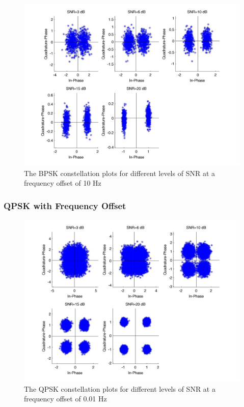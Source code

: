 \documentclass[]{article}
\begin{document}
\begin{figure}[H]
\centering
\hspace*{-2cm}\includegraphics[width=1.3\textwidth]{bpConstfo4.jpg}
\caption{The BPSK constellation plots for different levels of SNR at a frequency offset of 10 Hz}
\end{figure}

\subsubsection{QPSK with Frequency Offset}
\begin{figure}[H]
\centering
\hspace*{-2cm}\includegraphics[width=1.3\textwidth]{qpConstfo1.jpg}
\caption{The QPSK constellation plots for different levels of SNR at a frequency offset of 0.01 Hz}
\end{figure}
\end{document}
